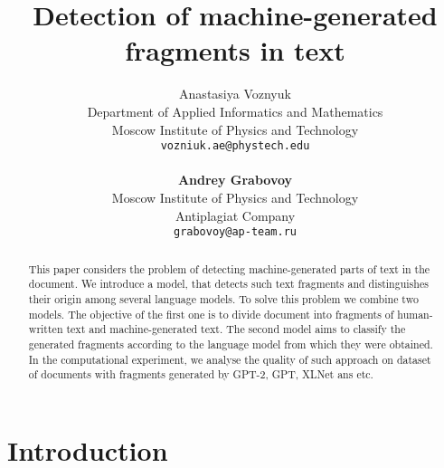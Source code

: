 \documentclass{article}
\title{Detection of machine-generated fragments in text}
\author{ Anastasiya Voznyuk \\
	Department of Applied Informatics and Mathematics\\
	Moscow Institute of Physics and Technology\\
	\texttt{vozniuk.ae@phystech.edu} \\
    \\
    \textbf{Andrey Grabovoy} \\
	Moscow Institute of Physics and Technology\\
    Antiplagiat Company \\
	\texttt{grabovoy@ap-team.ru}}
\date{}
\begin{document}
\maketitle

\begin{abstract}
	This paper considers the problem of detecting machine-generated parts of text in the document. We introduce a model, that detects such text fragments and distinguishes their origin among several language models. To solve this problem we combine two models. The objective of the first one is to divide document into fragments of human-written text and machine-generated text. The second model aims to classify the generated fragments according to the language model from which they were obtained. In the computational experiment, we analyse the quality of such approach on dataset of documents with fragments generated by GPT-2, GPT, XLNet ans etc.
\end{abstract}



\section{Introduction}
\end{document}
